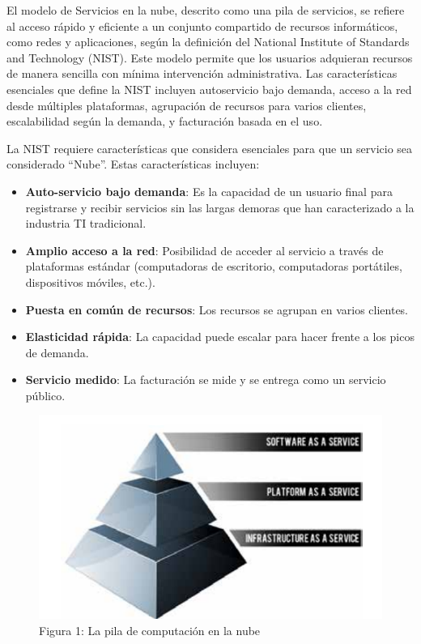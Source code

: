 \documentclass{article}
\begin{document}
El modelo de Servicios en la nube, descrito como una pila de servicios, se refiere al acceso rápido y eficiente a un conjunto compartido de recursos informáticos, como redes y aplicaciones, según la definición del National Institute of Standards and Technology (NIST). Este modelo permite que los usuarios adquieran recursos de manera sencilla con mínima intervención administrativa. Las características esenciales que define la NIST incluyen autoservicio bajo demanda, acceso a la red desde múltiples plataformas, agrupación de recursos para varios clientes, escalabilidad según la demanda, y facturación basada en el uso.

La NIST requiere características que considera esenciales para que un servicio sea considerado
“Nube”. Estas características incluyen:

\begin{itemize}
    \item \textbf{Auto-servicio bajo demanda}: Es la capacidad de un usuario final para registrarse y recibir servicios sin las largas demoras que han caracterizado a la industria TI tradicional.
    \item \textbf{Amplio acceso a la red}: Posibilidad de acceder al servicio a través de plataformas estándar (computadoras de escritorio, computadoras portátiles, dispositivos móviles, etc.).
    \item \textbf{Puesta en común de recursos}: Los recursos se agrupan en varios clientes.
    \item \textbf{Elasticidad rápida}: La capacidad puede escalar para hacer frente a los picos de demanda.
    \item \textbf{Servicio medido}: La facturación se mide y se entrega como un servicio público.
\end{itemize}

\begin{figure}
\centering
\includegraphics[width=0.95\linewidth]{Captura de pantalla 2024-10-18 211038.png}
\caption{\label{fig:cloud_computing}Figura 1: La pila de computación en la nube}
\end{figure}
\end{document}
